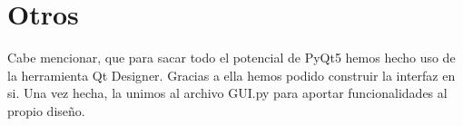 \section{Otros}
Cabe mencionar, que para sacar todo el potencial de PyQt5 hemos hecho uso de la herramienta Qt Designer. Gracias a ella hemos podido construir la interfaz en si. Una vez hecha, la unimos al archivo GUI.py para aportar funcionalidades al propio diseño.
